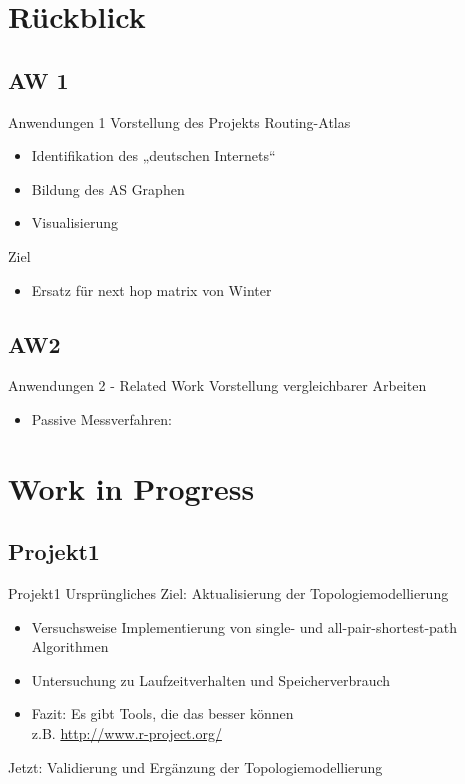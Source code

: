 \documentclass[ngerman,compress,hyperref={bookmarks}]{beamer}
\begin{document}
\section{Rückblick}
\subsection{AW 1}
\begin{frame}{Anwendungen 1}
  Vorstellung des Projekts Routing-Atlas\\
  \begin{itemize}
    \item Identifikation des „deutschen Internets“
    \item Bildung des AS Graphen
    \item Visualisierung
  \end{itemize}
  \vspace{0.5cm}
  Ziel\\
  \begin{itemize}
    \item Ersatz für next hop matrix von Winter
  \end{itemize}
\end{frame}

\subsection{AW2}
\begin{frame}{Anwendungen 2 - Related Work}
  Vorstellung vergleichbarer Arbeiten
  \begin{itemize}
    \item Passive Messverfahren:
  \end{itemize}
\end{frame}

\section{Work in Progress}
\subsection{Projekt1}
\begin{frame}[allowframebreaks]{Projekt1}
  Ursprüngliches Ziel: Aktualisierung der Topologiemodellierung
  \begin{itemize}
    \item Versuchsweise Implementierung von single- und all-pair-shortest-path Algorithmen
    \item Untersuchung zu Laufzeitverhalten und Speicherverbrauch
    \item Fazit: Es gibt Tools, die das besser können\\
    \hspace{0.2cm}z.B. \url{http://www.r-project.org/}
  \end{itemize}
  \framebreak

  Jetzt: Validierung und Ergänzung der Topologiemodellierung
\end{frame}
\end{document}
